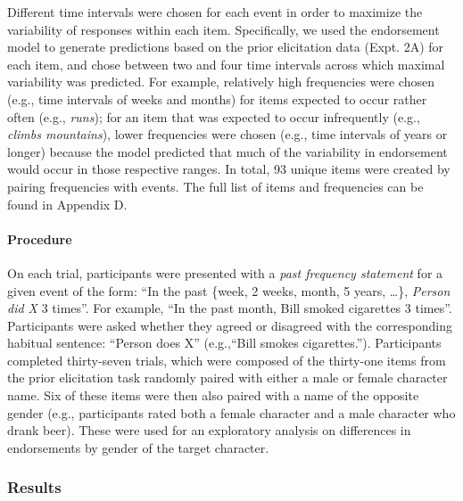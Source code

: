 \documentclass[english,,man,floatsintext]{apa6}
\let\oldparagraph\paragraph
\renewcommand{\paragraph}[1]{\oldparagraph{#1}\mbox{}}
\theoremstyle{definition}
\theoremstyle{definition}
\theoremstyle{definition}
\theoremstyle{remark}
\begin{document}
Different time intervals were chosen for each event in order to maximize
the variability of responses within each item. Specifically, we used the
endorsement model to generate predictions based on the prior elicitation
data (Expt. 2A) for each item, and chose between two and four time
intervals across which maximal variability was predicted. For example,
relatively high frequencies were chosen (e.g., time intervals of weeks
and months) for items expected to occur rather often (e.g.,
\emph{runs}); for an item that was expected to occur infrequently (e.g.,
\emph{climbs mountains}), lower frequencies were chosen (e.g., time
intervals of years or longer) because the model predicted that much of
the variability in endorsement would occur in those respective ranges.
In total, 93 unique items were created by pairing frequencies with
events. The full list of items and frequencies can be found in Appendix
D.

\hypertarget{procedure-1}{%
\paragraph{Procedure}\label{procedure-1}}

On each trial, participants were presented with a \emph{past frequency
statement} for a given event of the form: \enquote{In the past \{week, 2
weeks, month, 5 years, \ldots{}\}, \emph{Person did X} 3 times}. For
example, \enquote{In the past month, Bill smoked cigarettes 3 times}.
Participants were asked whether they agreed or disagreed with the
corresponding habitual sentence: \enquote{Person does X}
(e.g.,\enquote{Bill smokes cigarettes.}). Participants completed
thirty-seven trials, which were composed of the thirty-one items from
the prior elicitation task randomly paired with either a male or female
character name. Six of these items were then also paired with a name of
the opposite gender (e.g., participants rated both a female character
and a male character who drank beer). These were used for an exploratory
analysis on differences in endorsements by gender of the target
character.

\hypertarget{results-1}{%
\subsubsection{Results}\label{results-1}}
\end{document}
